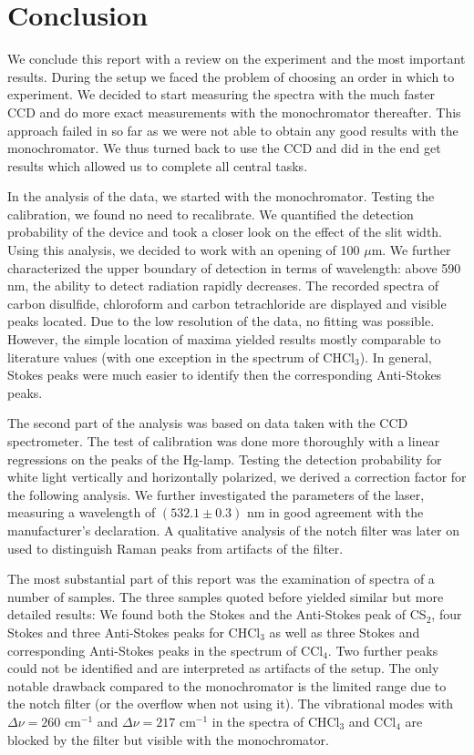 \section{Conclusion}
We conclude this report with a review on the experiment and the most important results. During the setup we faced the
problem of choosing an order in which to experiment. We decided to start measuring the spectra with the much faster CCD
and do more exact measurements with the monochromator thereafter. This approach failed in so far as we were not able to 
obtain any good results with the monochromator. We thus turned back to use the CCD and did in the end get results 
which allowed us to complete all central tasks. 

In the analysis of the data, we started with the monochromator. Testing the calibration, we found no need to recalibrate. 
We quantified the detection probability of the device and took a closer look on the effect of the slit width. Using this 
analysis, we decided to work with an opening of 100 $\mu$m. We further characterized the upper boundary of detection in 
terms of wavelength: above 590 nm, the ability to detect radiation rapidly decreases. The recorded spectra of carbon 
disulfide, chloroform and carbon tetrachloride are displayed and visible peaks located. Due to the low resolution of the 
data, no fitting was possible. However, the simple location of maxima yielded results mostly comparable to literature 
values (with one exception in the spectrum of CHCl$_3$). In general, Stokes peaks were much easier to identify then 
the corresponding Anti-Stokes peaks. 

The second part of the analysis was based on data taken with the CCD spectrometer. The test of calibration was done more 
thoroughly with a linear regressions on the peaks of the Hg-lamp. Testing the detection probability for white light 
vertically and horizontally polarized, we derived a correction factor for the following analysis. We further investigated
the parameters of the laser, measuring a wavelength of $(532.1 \pm 0.3)$ nm in good agreement with the manufacturer's
declaration. A qualitative analysis of the notch filter was later on used to distinguish Raman peaks from artifacts of 
the filter. 

The most substantial part of this report was the examination of spectra of a number of samples. The three samples quoted 
before yielded similar but more detailed results: We found both the Stokes and the Anti-Stokes peak of CS$_2$, four 
Stokes and three Anti-Stokes peaks for CHCl$_3$ as well as three Stokes and corresponding Anti-Stokes peaks in the 
spectrum of CCl$_4$. Two further peaks could not be identified and are interpreted as artifacts of the setup. The only 
notable drawback compared to the monochromator is the limited range due to the notch filter (or the overflow when not 
using it). The vibrational modes with $\Delta \nu = 260 \text{ cm}^{-1}$ and $\Delta \nu = 217 \text{ cm}^{-1}$ in the 
spectra of CHCl$_3$ and CCl$_4$ are blocked by the filter but visible with the monochromator. 

